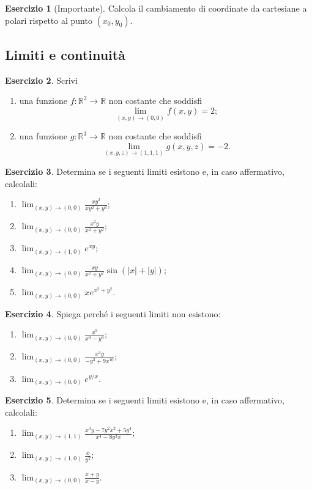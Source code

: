 \documentclass[12pt,a4paper]{article}
\theoremstyle{definition}
\newtheorem{exe}{Esercizio}
\begin{document}
\begin{exe}[Importante]
    Calcola il cambiamento di coordinate da cartesiane a polari rispetto al punto $(x_0, y_0)$.
\end{exe}

\subsection*{Limiti e continuità}

\begin{exe}
    Scrivi
    \begin{enumerate}
        \item una funzione $f: \mathbb{R}^2 \to \mathbb{R}$ non costante che soddisfi
              \[ \lim_{(x,y) \to (0,0)} f(x,y) = 2; \]
        \item una funzione $g: \mathbb{R}^3 \to \mathbb{R}$ non costante che soddisfi
              \[ \lim_{(x,y,z) \to (1,1,1)} g(x,y,z) = -2. \]
    \end{enumerate}
\end{exe}

\begin{exe}
    Determina se i seguenti limiti esistono e, in caso affermativo, calcolali:
    \begin{enumerate}
        \item $\lim_{(x,y) \to (0,0)} \frac{xy^2}{xy^2 + y^3}$;
        \item $\lim_{(x,y) \to (0,0)} \frac{x^2y}{x^2 + y^2}$;
        \item $\lim_{(x,y) \to (1,0)} e^{xy}$;
        \item $\lim_{(x,y) \to (0,0)} \frac{xy}{x^2 + y^2} \sin(|x| + |y|)$;
        \item $\lim_{(x,y) \to (0,0)} x e^{x^2 + y^2}$.
    \end{enumerate}
\end{exe}

\begin{exe}
    Spiega perché i seguenti limiti non esistono:
    \begin{enumerate}
        \item $\lim_{(x,y) \to (0,0)} \frac{x^9}{x^9 - y^9}$;
        \item $\lim_{(x,y) \to (0,0)} \frac{x^3y}{-y^3 + 9x^{10}}$;
        \item $\lim_{(x,y) \to (0,0)} e^{y/x}$.
    \end{enumerate}
\end{exe}

\begin{exe}
    Determina se i seguenti limiti esistono e, in caso affermativo, calcolali:
    \begin{enumerate}
        \item $\lim_{(x,y) \to (1,1)} \frac{x^3y - 7y^2x^2 + 5y^4}{x^4 - 8y^3x}$;
        \item $\lim_{(x,y) \to (1,0)} \frac{x}{y^2}$;
        \item $\lim_{(x,y) \to (0,0)} \frac{x+y}{x-y}$.
    \end{enumerate}
\end{exe}
\end{document}
